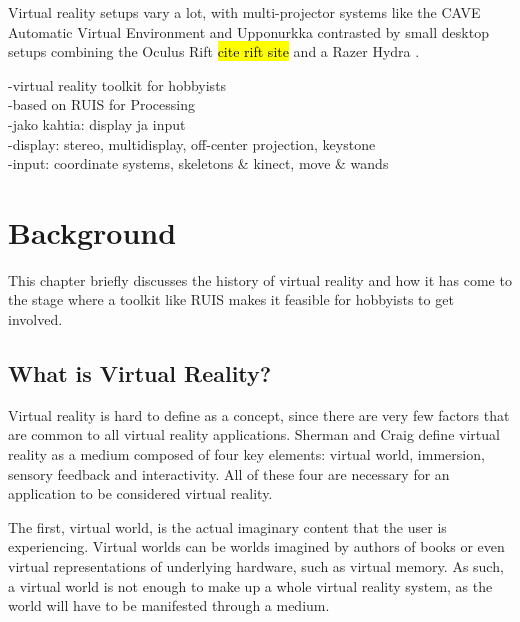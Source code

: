 \documentclass[12pt,a4paper,oneside,pdftex]{report}
\begin{document}
Virtual reality setups vary a lot, with multi-projector systems like the CAVE Automatic Virtual Environment \cite{CAVE1, CAVE2} and Upponurkka \cite{Upponurkka} contrasted by small desktop setups combining the Oculus Rift \hl{cite rift site} and a Razer Hydra \cite{RazerHydra}.


-virtual reality toolkit for hobbyists \\
-based on RUIS for Processing \\
-jako kahtia: display ja input \\
 -display: stereo, multidisplay, off-center projection, keystone \\
 -input: coordinate systems, skeletons & kinect, move & wands \\


% 




\chapter{Background}
\label{chapter:background}

This chapter briefly discusses the history of virtual reality and how it has come to the stage where a toolkit like RUIS makes it feasible for hobbyists to get involved.

\section{What is Virtual Reality?}
\label{section:whatisvr}

Virtual reality is hard to define as a concept, since there are very few factors that are common to all virtual reality applications. Sherman and Craig \cite{Sherman:2002:UVR:581839} define virtual reality as a medium composed of four key elements: virtual world, immersion, sensory feedback and interactivity. All of these four are necessary for an application to be considered virtual reality. 

The first, virtual world, is the actual imaginary content that the user is experiencing. Virtual worlds can be worlds imagined by authors of books or even virtual representations of underlying hardware, such as virtual memory. As such, a virtual world is not enough to make up a whole virtual reality system, as the world will have to be manifested through a medium.
\end{document}
